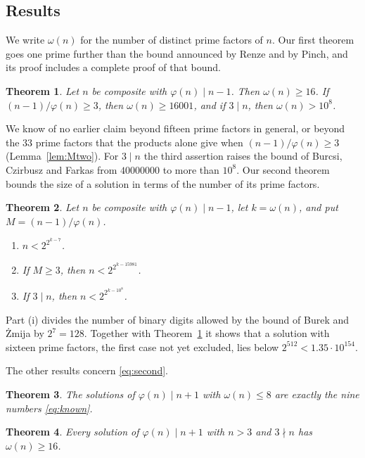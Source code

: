 \documentclass[11pt,reqno]{amsart}
\numberwithin{equation}{section}
\theoremstyle{plain}
\newtheorem{theorem}{Theorem}[section]
\theoremstyle{definition}
\theoremstyle{remark}
\begin{document}
\subsection{Results}
We write $\omega(n)$ for the number of distinct prime factors of $n$.
Our first theorem goes one prime further than the bound announced by
Renze and by Pinch, and its proof includes a complete proof of that
bound.

\begin{theorem}\label{thm:first}
Let $n$ be composite with $\varphi(n)\mid n-1$. Then $\omega(n)\ge16$.
If $(n-1)/\varphi(n)\ge3$, then $\omega(n)\ge16001$, and if $3\mid n$,
then $\omega(n)>10^8$.
\end{theorem}

We know of no earlier claim beyond fifteen prime factors in general,
or beyond the $33$ prime factors that the products alone give when
$(n-1)/\varphi(n)\ge3$ (Lemma~\ref{lem:Mtwo}). For $3\mid n$ the third
assertion raises the bound of Burcsi, Czirbusz and Farkas from
$40000000$ to more than $10^8$. Our second theorem bounds the size of a solution in terms of the
number of its prime factors.

\begin{theorem}\label{thm:size}
Let $n$ be composite with $\varphi(n)\mid n-1$, let $k=\omega(n)$, and
put $M=(n-1)/\varphi(n)$.
\begin{enumerate}[label=\textup{(\roman*)}]
\item $n<2^{2^{k-7}}$.
\item If $M\ge3$, then $n<2^{2^{k-15981}}$.
\item If $3\mid n$, then $n<2^{2^{k-10^8}}$.
\end{enumerate}
\end{theorem}

Part (i) divides the number of binary digits allowed by the bound of
Burek and \.Zmija by $2^7=128$. Together with Theorem~\ref{thm:first}
it shows that a solution with sixteen prime factors, the first case
not yet excluded, lies below $2^{512}<1.35\cdot10^{154}$.

The other results concern \eqref{eq:second}.

\begin{theorem}\label{thm:eight}
The solutions of $\varphi(n)\mid n+1$ with $\omega(n)\le8$ are exactly
the nine numbers \eqref{eq:known}.
\end{theorem}

\begin{theorem}\label{thm:coprime}
Every solution of $\varphi(n)\mid n+1$ with $n>3$ and $3\nmid n$ has
$\omega(n)\ge16$.
\end{theorem}
\end{document}
